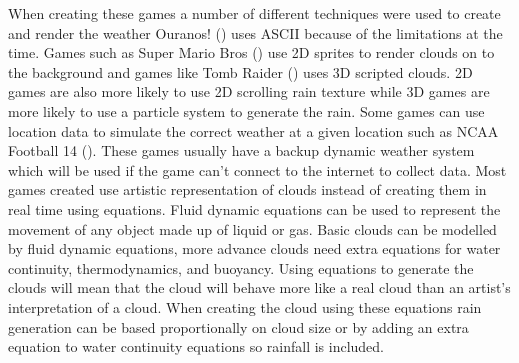 When creating these games a number of different techniques were used to create and render the weather Ouranos! (\citeyear{Ouranos80}) uses ASCII because of the limitations at the time.
Games such as Super Mario Bros (\citeyear{SMB85}) use 2D sprites to render clouds on to the background and games like Tomb Raider (\citeyear{TombRaider13}) uses 3D scripted clouds.
2D games are also more likely to use 2D scrolling rain texture while 3D games are more likely to use a particle system to generate the rain.
Some games can use location data to simulate the correct weather at a given location such as NCAA Football 14 (\citeyear{NCAAF13}).
These games usually have a backup dynamic weather system which will be used if the game can't connect to the internet to collect data. 
Most games created use artistic representation of clouds instead of creating them in real time using equations.
Fluid dynamic equations can be used to represent the movement of any object made up of liquid or gas.
Basic clouds can be modelled by fluid dynamic equations, more advance clouds need extra equations for water continuity, thermodynamics, and buoyancy.
Using equations to generate the clouds will mean that the cloud will behave more like a real cloud than an artist's interpretation of a cloud.
When creating the cloud using these equations rain generation can be based proportionally on cloud size or by adding an extra equation to water continuity equations so rainfall is included.